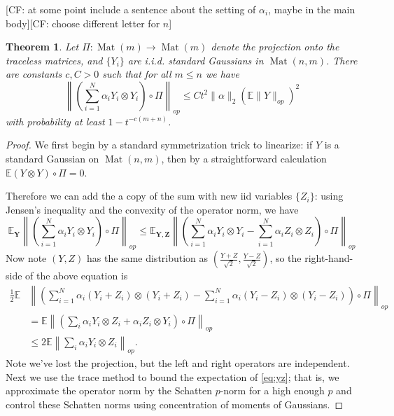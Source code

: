 \documentclass{article}
\newtheorem{theorem}{Theorem}
\newcommand{\ot}{\otimes}
\newcommand{\mat}{\operatorname{Mat}}
\renewcommand{\vec}{\bm}
\newcommand{\E}{\mathbb{E}}
\newcommand\tr{\operatorname{Tr}}
\newcommand{\CF}[1]{{\color{purple}[CF: #1]}}
\begin{document}
\CF{at some point include a sentence about the setting of $\alpha_i$, maybe in the main body}\CF{choose different letter for $n$}
\begin{theorem}
Let $\Pi: \mat(m) \to \mat(m)$ denote the projection onto the traceless matrices, and $\{Y_{i}\}$ are i.i.d. standard Gaussians in $\mat(n,m)$. There are constants $c,C > 0$ such that for all $m \leq n$ we have 
\[ \left\| \left(\sum_{i=1}^{N} \alpha_{i} Y_{i} \otimes Y_{i}\right) \circ \Pi \right\|_{op} \leq C t^{2} \|\alpha\|_{2} \left( \E \|Y\|_{op} \right)^{2} \]
with probability at least $ 1- t^{-c(m+n)}$. 
\end{theorem}
\begin{proof}
We first begin by a standard symmetrization trick to linearize: if $Y$ is a standard Gaussian on $\mat(n,m)$, then by a straightforward calculation $\E (Y \otimes Y)\circ \Pi = 0$.

Therefore we can add the a copy of the sum with new iid variables $\{Z_{i}\}$: using Jensen's inequality and the convexity of the operator norm, we have
\[ \E_{\vec Y} \left\|\left(\sum_{i=1}^{N} \alpha_{i} Y_{i} \otimes Y_{i}\right) \circ \Pi\right\|_{op} \leq 
\E_{\vec Y,\vec Z} \left\|\left(\sum_{i=1}^{N} \alpha_{i} Y_{i} \otimes Y_{i}-\sum_{i=1}^{N} \alpha_{i} Z_{i} \otimes Z_{i}\right) \circ \Pi \right\|_{op}  \] Now note $(Y,Z)$ has the same distribution as $(\frac{Y+Z}{\sqrt{2}},\frac{Y-Z}{\sqrt{2}})$, so the right-hand-side of the above equation is
\begin{align}\frac{1}{2}\E &\left\|\left(\sum_{i=1}^{N} \alpha_{i} (Y_{i}+Z_{i}) \otimes (Y_{i}+Z_{i})  - \sum_{i=1}^{N} \alpha_{i} (Y_{i}-Z_{i}) \otimes (Y_{i}-Z_{i})\right)\circ \Pi \right\|_{op}\nonumber \\ 
& = \E \left\|\left(\sum_{i} \alpha_{i} Y_{i} \otimes Z_{i}  + \alpha_{i} Z_{i} \otimes Y_{i} \right) \circ \Pi \right\|_{op}  \nonumber\\
& \leq 2 \E \left\|\sum_{i} \alpha_{i} Y_{i} \otimes Z_{i}\right\|_{op}.   \label{eq:yz}
\end{align}
Note we've lost the projection, but the left and right operators are independent. Next we use the trace method to bound the expectation of \cref{eq:yz}; that is, we approximate the operator norm by the Schatten $p$-norm for a high enough $p$ and control these Schatten norms using concentration of moments of Gaussians.  


\end{proof}
\end{document}
